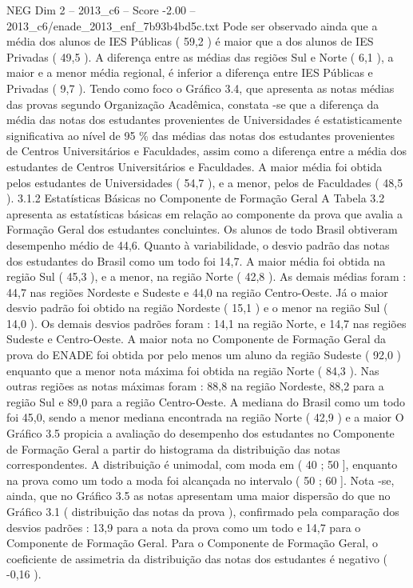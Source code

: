 \begin{textsample}{NEG Dim 2 – 2013\_c6 – Score -2.00 – 2013\_c6/enade\_2013\_enf\_7b93b4bd5c.txt}
Pode ser observado ainda que a média dos alunos de IES Públicas ( 59,2 ) é maior que a dos alunos de IES Privadas ( 49,5 ).
A diferença entre as médias das regiões Sul e Norte ( 6,1 ), a maior e a menor média regional, é inferior a diferença entre IES Públicas e Privadas ( 9,7 ).
Tendo como foco o Gráfico 3.4, que apresenta as notas médias das provas segundo Organização Acadêmica, constata -se que a diferença da média das notas dos estudantes provenientes de Universidades é estatisticamente significativa ao nível de 95 \% das médias das notas dos estudantes provenientes de Centros Universitários e Faculdades, assim como a diferença entre a média dos estudantes de Centros Universitários e Faculdades.
A maior média foi obtida pelos estudantes de Universidades ( 54,7 ), e a menor, pelos de Faculdades ( 48,5 ). 3.1.2 Estatísticas Básicas no Componente de Formação Geral A Tabela 3.2 apresenta as estatísticas básicas em relação ao componente da prova que avalia a Formação Geral dos estudantes concluintes.
Os alunos de todo Brasil obtiveram desempenho médio de 44,6.
Quanto à variabilidade, o desvio padrão das notas dos estudantes do Brasil como um todo foi 14,7.
A maior média foi obtida na região Sul ( 45,3 ), e a menor, na região Norte ( 42,8 ).
As demais médias foram : 44,7 nas regiões Nordeste e Sudeste e 44,0 na região Centro-Oeste.
Já o maior desvio padrão foi obtido na região Nordeste ( 15,1 ) e o menor na região Sul ( 14,0 ).
Os demais desvios padrões foram : 14,1 na região Norte, e 14,7 nas regiões Sudeste e Centro-Oeste.
A maior nota no Componente de Formação Geral da prova do ENADE foi obtida por pelo menos um aluno da região Sudeste ( 92,0 ) enquanto que a menor nota máxima foi obtida na região Norte ( 84,3 ).
Nas outras regiões as notas máximas foram : 88,8 na região Nordeste, 88,2 para a região Sul e 89,0 para a região Centro-Oeste.
A mediana do Brasil como um todo foi 45,0, sendo a menor mediana encontrada na região Norte ( 42,9 ) e a maior O Gráfico 3.5 propicia a avaliação do desempenho dos estudantes no Componente de Formação Geral a partir do histograma da distribuição das notas correspondentes.
A distribuição é unimodal, com moda em ( 40 ; 50 ], enquanto na prova como um todo a moda foi alcançada no intervalo ( 50 ; 60 ].
Nota -se, ainda, que no Gráfico 3.5 as notas apresentam uma maior dispersão do que no Gráfico 3.1 ( distribuição das notas da prova ), confirmado pela comparação dos desvios padrões : 13,9 para a nota da prova como um todo e 14,7 para o Componente de Formação Geral.
Para o Componente de Formação Geral, o coeficiente de assimetria da distribuição das notas dos estudantes é negativo ( -0,16 ).

\end{textsample}
